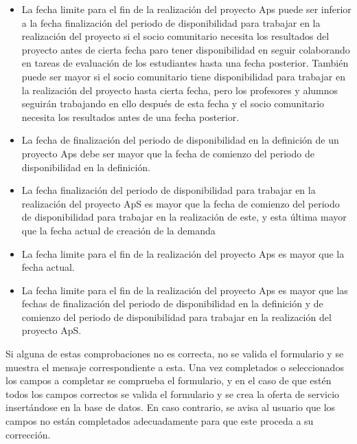\documentclass[11pt]{book}
\begin{document}
\begin{itemize}
 \item La fecha limite para el fin de la realización del proyecto Aps puede ser inferior a la fecha finalización del periodo de disponibilidad para trabajar en la realización del proyecto si el socio comunitario necesita los resultados del proyecto antes de cierta fecha paro tener disponibilidad en seguir colaborando en tareas de evaluación de los estudiantes hasta una fecha posterior. También puede ser mayor si el socio
 comunitario tiene disponibilidad para trabajar en la realización del
 proyecto hasta cierta fecha, pero los profesores y alumnos seguirán
 trabajando en ello después de esta fecha y el socio comunitario necesita
 los resultados antes de una fecha posterior.
  \item La fecha de finalización del periodo de disponibilidad en la definición de un proyecto Aps debe ser mayor que la fecha de comienzo del periodo de disponibilidad en la definición.
  \item La fecha finalización del periodo de disponibilidad para trabajar en la realización
del proyecto ApS es mayor que la fecha de comienzo del periodo de disponibilidad para trabajar en la realización de este, y esta última mayor que la fecha actual de creación de la demanda 
  \item La fecha limite para el fin de la realización del proyecto Aps es mayor que la fecha actual.
  \item La fecha limite para el fin de la realización del proyecto Aps es mayor que las fechas de finalización del periodo de disponibilidad en la definición y de comienzo del periodo de disponibilidad para trabajar en la realización del proyecto ApS. 

\end{itemize}
Si alguna de estas comprobaciones no es correcta, no se valida el formulario y se muestra el mensaje correspondiente a esta. Una vez completados o seleccionados los campos a completar se comprueba el formulario, y en el caso de que estén todos los campos correctos se valida el formulario y se crea la oferta de servicio insertándose en la base de datos. En caso contrario, se avisa al usuario que los campos no están completados adecuadamente para que este proceda a su corrección.\\\\
\end{document}

